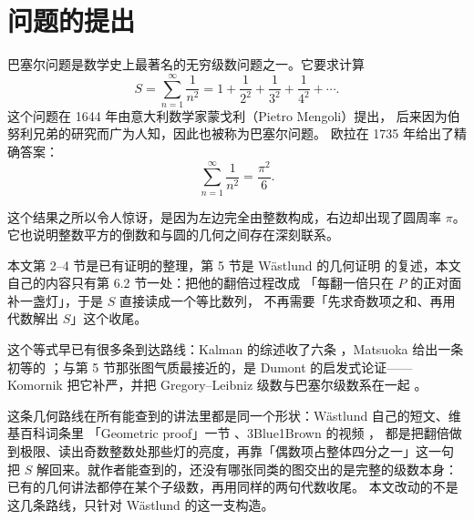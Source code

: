 \section{问题的提出}

巴塞尔问题是数学史上最著名的无穷级数问题之一。它要求计算
\begin{equation}
  S=\sum_{n=1}^{\infty}\frac{1}{n^2}
   =1+\frac{1}{2^{2}}+\frac{1}{3^{2}}+\frac{1}{4^{2}}+\cdots .
  \label{eq:basel}
\end{equation}
这个问题在 1644 年由意大利数学家蒙戈利（Pietro Mengoli）提出，
后来因为伯努利兄弟的研究而广为人知，因此也被称为巴塞尔问题。
欧拉在 1735 年给出了精确答案：
\begin{equation}
  \boxed{\sum_{n=1}^{\infty}\frac{1}{n^2}=\frac{\pi^2}{6}}.
  \label{eq:answer}
\end{equation}

这个结果之所以令人惊讶，是因为左边完全由整数构成，右边却出现了圆周率 $\pi$。
它也说明整数平方的倒数和与圆的几何之间存在深刻联系。

本文第 2--4 节是已有证明的整理，第 5 节是 Wästlund 的几何证明
\cite{wastlund} 的复述，本文自己的内容只有第 6.2 节一处：把他的翻倍过程改成
「每翻一倍只在 $P$ 的正对面补一盏灯」，于是 $S$ 直接读成一个等比数列，
不再需要「先求奇数项之和、再用代数解出 $S$」这个收尾。

这个等式早已有很多条到达路线：Kalman 的综述收了六条 \cite{kalman}，Matsuoka 给出一条
初等的 \cite{matsuoka}；与第 5 节那张图气质最接近的，是 Dumont 的启发式论证——
Komornik 把它补严，并把 Gregory--Leibniz 级数与巴塞尔级数系在一起 \cite{komornik}。

这条几何路线在所有能查到的讲法里都是同一个形状：Wästlund 自己的短文、维基百科词条里
「Geometric proof」一节 \cite{wikipedia}、3Blue1Brown 的视频 \cite{threeblueonebrown}，
都是把翻倍做到极限、读出奇数整数处那些灯的亮度，再靠「偶数项占整体四分之一」这一句
把 $S$ 解回来。就作者能查到的，还没有哪张同类的图交出的是完整的级数本身：
已有的几何讲法都停在某个子级数，再用同样的两句代数收尾。
本文改动的不是这几条路线，只针对 Wästlund 的这一支构造。
